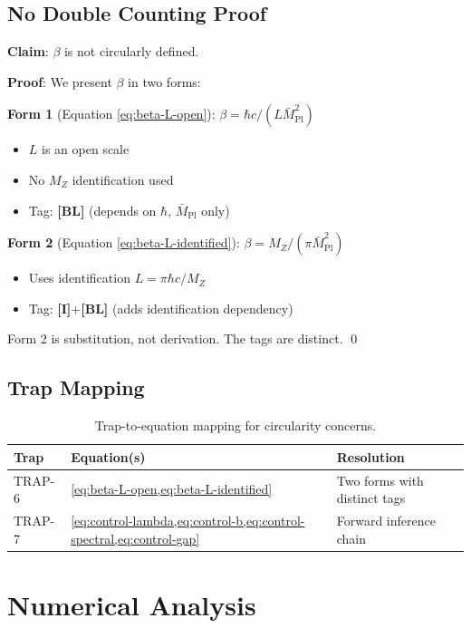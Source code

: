 \documentclass[11pt,a4paper]{article}
\newcommand{\Mpl}{\bar{M}_{\mathrm{Pl}}}
\newcommand{\MZ}{M_Z}
\newcommand{\tagI}{\textbf{[I]}}
\newcommand{\tagBL}{\textbf{[BL]}}
\theoremstyle{definition}
\theoremstyle{plain}
\theoremstyle{remark}
\begin{document}
\subsection{No Double Counting Proof}

\textbf{Claim}: $\beta$ is not circularly defined.

\textbf{Proof}: We present $\beta$ in two forms:

\textbf{Form 1} (Equation \ref{eq:beta-L-open}): $\beta = \hbar c/(L\Mpl^2)$
\begin{itemize}
\item $L$ is an open scale
\item No $\MZ$ identification used
\item Tag: \tagBL{} (depends on $\hbar$, $\Mpl$ only)
\end{itemize}

\textbf{Form 2} (Equation \ref{eq:beta-L-identified}): $\beta = \MZ/(\pi\Mpl^2)$
\begin{itemize}
\item Uses identification $L = \pi\hbar c/\MZ$
\item Tag: \tagI{}+\tagBL{} (adds identification dependency)
\end{itemize}

Form 2 is substitution, not derivation. The tags are distinct. \qed

\subsection{Trap Mapping}

\begin{table}[htbp]
\centering
\caption{Trap-to-equation mapping for circularity concerns.}
\label{tab:trap-map}
\begin{tabular}{@{}lll@{}}
\toprule
Trap & Equation(s) & Resolution \\
\midrule
TRAP-6 & \cref{eq:beta-L-open,eq:beta-L-identified} & Two forms with distinct tags \\
TRAP-7 & \cref{eq:control-lambda,eq:control-b,eq:control-spectral,eq:control-gap} & Forward inference chain \\
\bottomrule
\end{tabular}
\end{table}

\section{Numerical Analysis}
\label{sec:numerical}
\end{document}
